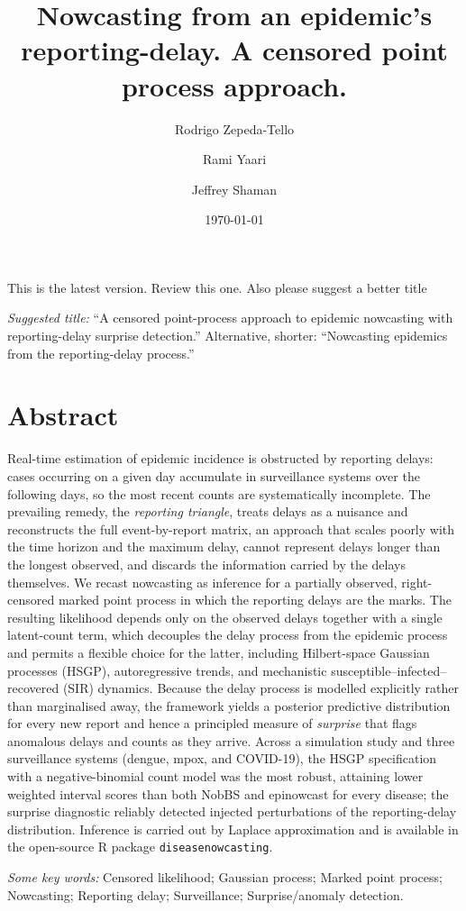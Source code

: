 \documentclass[12pt]{article}
\title{Nowcasting from an epidemic's reporting-delay. A censored point process approach.}
\author{Rodrigo Zepeda-Tello \and Rami Yaari \and Jeffrey Shaman}
\date{\today{}}
\begin{document}
\maketitle

{\color{blue} \Large This is the latest version. Review this one. Also please suggest a better title}

{\color{red} \emph{Suggested title:} ``A censored point-process approach to epidemic nowcasting with reporting-delay surprise detection.'' Alternative, shorter: ``Nowcasting epidemics from the reporting-delay process.''}

\section{Abstract}

{\color{red}
Real-time estimation of epidemic incidence is obstructed by reporting delays: cases occurring on a given day accumulate in surveillance systems over the following days, so the most recent counts are systematically incomplete. The prevailing remedy, the \emph{reporting triangle}, treats delays as a nuisance and reconstructs the full event-by-report matrix, an approach that scales poorly with the time horizon and the maximum delay, cannot represent delays longer than the longest observed, and discards the information carried by the delays themselves. We recast nowcasting as inference for a partially observed, right-censored marked point process in which the reporting delays are the marks. The resulting likelihood depends only on the observed delays together with a single latent-count term, which decouples the delay process from the epidemic process and permits a flexible choice for the latter, including Hilbert-space Gaussian processes (HSGP), autoregressive trends, and mechanistic susceptible--infected--recovered (SIR) dynamics. Because the delay process is modelled explicitly rather than marginalised away, the framework yields a posterior predictive distribution for every new report and hence a principled measure of \emph{surprise} that flags anomalous delays and counts as they arrive. Across a simulation study and three surveillance systems (dengue, mpox, and COVID-19), the HSGP specification with a negative-binomial count model was the most robust, attaining lower weighted interval scores than both NobBS and epinowcast for every disease; the surprise diagnostic reliably detected injected perturbations of the reporting-delay distribution. Inference is carried out by Laplace approximation and is available in the open-source R package \texttt{diseasenowcasting}.

\medskip
\noindent\emph{Some key words:} Censored likelihood; Gaussian process; Marked point process; Nowcasting; Reporting delay; Surveillance; Surprise/anomaly detection.
}
\end{document}
